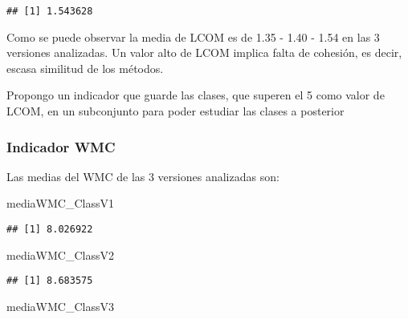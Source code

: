 \documentclass[
]{article}
\newenvironment{Shaded}{\begin{snugshade}}{\end{snugshade}}
\newcommand{\DecValTok}[1]{\textcolor[rgb]{0.00,0.00,0.81}{#1}}
\newcommand{\NormalTok}[1]{#1}
\newcommand{\OtherTok}[1]{\textcolor[rgb]{0.56,0.35,0.01}{#1}}
\newcommand{\SpecialCharTok}[1]{\textcolor[rgb]{0.00,0.00,0.00}{#1}}
\begin{document}
\begin{verbatim}
## [1] 1.543628
\end{verbatim}

Como se puede observar la media de LCOM es de 1.35 - 1.40 - 1.54 en las
3 versiones analizadas. Un valor alto de LCOM implica falta de cohesión,
es decir, escasa similitud de los métodos.

Propongo un indicador que guarde las clases, que superen el 5 como valor
de LCOM, en un subconjunto para poder estudiar las clases a posterior

\begin{Shaded}
\end{Shaded}

\hypertarget{indicador-wmc}{%
\subsubsection{Indicador WMC}\label{indicador-wmc}}

Las medias del WMC de las 3 versiones analizadas son:

\begin{Shaded}
\begin{Highlighting}[]
\NormalTok{mediaWMC\_ClassV1}
\end{Highlighting}
\end{Shaded}

\begin{verbatim}
## [1] 8.026922
\end{verbatim}

\begin{Shaded}
\begin{Highlighting}[]
\NormalTok{mediaWMC\_ClassV2}
\end{Highlighting}
\end{Shaded}

\begin{verbatim}
## [1] 8.683575
\end{verbatim}

\begin{Shaded}
\begin{Highlighting}[]
\NormalTok{mediaWMC\_ClassV3}
\end{Highlighting}
\end{Shaded}
\end{document}

